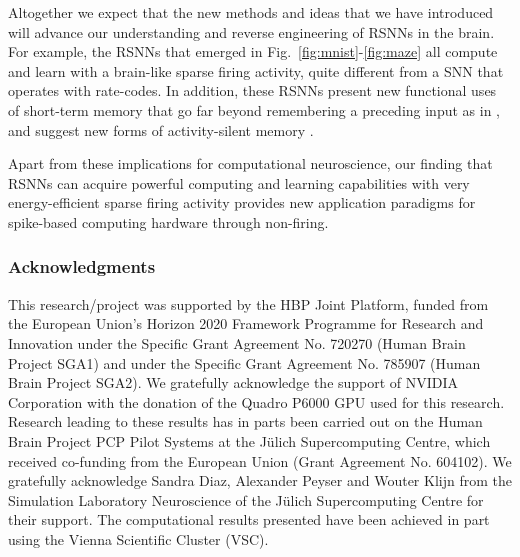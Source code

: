 \documentclass{article} \pdfoutput=1
\begin{document}
Altogether we expect that the new methods and ideas that we have introduced will advance our understanding and reverse engineering of RSNNs in the brain.
For example, the RSNNs that emerged in Fig.~\ref{fig:mnist}-\ref{fig:maze} all compute and learn with a brain-like sparse firing activity, quite different from a SNN that operates with rate-codes. In addition, these RSNNs present new functional uses of short-term memory that go far beyond remembering a preceding input as in \cite{mongillo_synaptic_2008}, and suggest new forms of activity-silent memory \cite{stokes_activity-silentworking_2015}. 

Apart from these implications for computational neuroscience, our finding that RSNNs can acquire powerful computing and learning capabilities with very energy-efficient sparse firing activity provides new application paradigms for spike-based computing hardware through non-firing.

\subsubsection*{Acknowledgments}

This research/project was supported by the HBP Joint Platform, funded from the European Union's Horizon 2020 Framework Programme for Research and Innovation under the Specific Grant Agreement No. 720270 (Human Brain Project SGA1) and under the Specific Grant Agreement No. 785907 (Human Brain Project SGA2). 
We gratefully acknowledge the support of NVIDIA Corporation with the donation of the Quadro P6000 GPU used for this research. 
Research leading to these results has in parts been carried out on the Human Brain Project PCP Pilot Systems at the J{\"u}lich Supercomputing Centre, which received co-funding from the European Union (Grant Agreement No. 604102).
We gratefully acknowledge Sandra Diaz, Alexander Peyser and Wouter Klijn from the Simulation Laboratory Neuroscience of the J{\"u}lich Supercomputing Centre for their support. 
The computational results presented have been achieved in part using the Vienna Scientific Cluster (VSC).




\small



\clearpage
\normalsize
\end{document}
